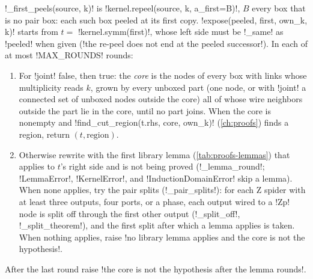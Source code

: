 \begin{algorithm}\label{alg:kernel-radix-expose}
\py!_first_peels(source, k)! is \py!kernel.repeel(source, k, a_first=B)!, $B$ every box that is no pair box: each such box peeled at its first copy. \py!expose(peeled, first, own_k, k)! starts from $t=$ \py!kernel.symm(first)!, whose left side must be \py!_same! as \py!peeled! when given (\code!the re-peel does not end at the peeled successor!). In each of at most \py!MAX_ROUNDS! rounds:
\begin{enumerate}
\item For \py!joint! false, then true: the \emph{core} is the nodes of every box with links whose multiplicity reads $k$, grown by every unboxed part (one node, or with \py!joint! a connected set of unboxed nodes outside the core) all of whose wire neighbors outside the part lie in the core, until no part joins. When the core is nonempty and \py!find_cut_region(t.rhs, core, own_k)! (\cref{ch:proofs}) finds a region, return $(t,\text{region})$.
\item Otherwise rewrite with the first library lemma (\cref{tab:proofs-lemmas}) that applies to $t$'s right side and is not being proved (\py!_lemma_round!; \py!LemmaError!, \py!KernelError!, and \py!InductionDomainError! skip a lemma). When none applies, try the pair splits (\py!_pair_splits!): for each Z spider with at least three outputs, four ports, or a phase, each output wired to a \code!Zp! node is split off through the first other output (\py!_split_off!, \py!_split_theorem!), and the first split after which a lemma applies is taken. When nothing applies, raise \code!no library lemma applies and the core is not the hypothesis!.
\end{enumerate}
After the last round raise \code!the core is not the hypothesis after the lemma rounds!.
\end{algorithm}


